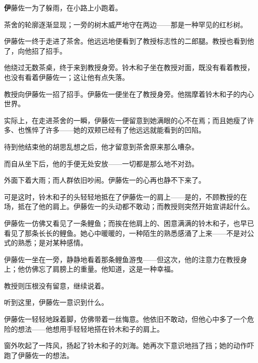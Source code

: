 
\AddSymbolsD
\pagecolor{Goldenrod!20!Gray}
\color{white}
\quad\quad \lettrine[,lraise=0.2,lhang=0.5]{\textbf{伊}}{藤}佐一为了躲雨，在小路上小跑着。

茶舍的轮廓逐渐显现；一旁的树木威严地守在两边——那是一种罕见的红杉树。

伊藤佐一终于走进了茶舍。他远远地便看到了教授标志性的二郎腿。教授也看到他了，向他招了招手。

他绕过无数茶桌，终于来到教授身旁。铃木和子坐在教授对面，既没有看着教授，也没有看着伊藤佐一；这让他有点失落。

教授向伊藤佐一招了招手。伊藤佐一便坐在了教授身旁。他揣摩着铃木和子的内心世界。

实际上，在走进茶舍的一瞬，伊藤佐一便留意到她满眼的心不在焉；而且她瘦了许多、也憔悴了许多——她的双颊已经有了他远远就能看到的凹陷。

待到他结束他的胡思乱想之后，他才留意到茶舍原来那么嘈杂。

而自从坐下后，他的手便无处安放——一切都是那么地不对劲。

外面下着大雨；而人群依旧吵闹。伊藤佐一的心再也静不下来了。

可是这时，铃木和子的头轻轻地抵在了伊藤佐一的肩上——是的，不顾教授的在场，抵在了他的肩上。伊藤佐一的头动都不敢动；而教授则突然开始宣讲起什么。


伊藤佐一仿佛又看见了一条鲤鱼；而挨在他肩上的、困意满满的铃木和子，也早已看见了那条长长的鲤鱼。她心中暖暖的，一种陌生的熟悉感涌了上来——不是对公式的熟悉；是对某种感情。

伊藤佐一坐在一旁，静静地看着那条鲤鱼游曳——但这次，他的注意力在教授身上；他仿佛忘了肩膀上的重量。他知道，这是一种幸福。

教授则压根没有留意，继续说着。


听到这里，伊藤佐一意识到什么。


伊藤佐一轻轻地跺着脚，仿佛带着一丝悔意。他依旧不敢动，但他心中多了一个危险的想法——他想用手轻轻地搭在铃木和子的肩上。

窗外吹起了一阵风，扬起了铃木和子的刘海。她再次下意识地挡了挡；她的动作吓跑了伊藤佐一的想法。

